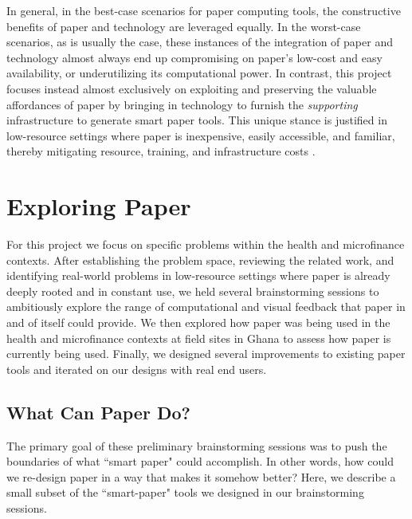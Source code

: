 \documentclass{sig-alternate}
\begin{document}
In general, in the best-case scenarios for paper computing tools, the constructive benefits of paper and technology are leveraged equally. In the worst-case scenarios, as is usually the case, these instances of the integration of paper and technology almost always end up compromising on paper's low-cost and easy availability, or underutilizing its computational power. In contrast, this project focuses instead almost exclusively on exploiting and preserving the valuable affordances of paper by bringing in technology to furnish the \emph{supporting} infrastructure to generate smart paper tools. This unique stance is justified in low-resource settings where paper is inexpensive, easily accessible, and familiar, thereby mitigating resource, training, and infrastructure costs \cite{chen2012}.



\section{Exploring Paper}
\label{sec:exploring-paper}

For this project we focus on specific problems within the health and microfinance contexts. After establishing the problem space, reviewing the related work, and identifying real-world problems in low-resource settings where paper is already deeply rooted and in constant use, we held several brainstorming sessions to ambitiously explore the range of computational and visual feedback that paper in and of itself could provide. We then explored how paper was being used in the health and microfinance contexts at field sites in Ghana to assess how paper is currently being used. Finally, we designed several improvements to existing paper tools and iterated on our designs with real end users.

\subsection{What Can Paper Do?}

The primary goal of these preliminary brainstorming sessions was to push the boundaries of what ``smart paper" could accomplish. In other words, how could we re-design paper in a way that makes it somehow better? Here, we describe a small subset of the ``smart-paper" tools we designed in our brainstorming sessions.
\end{document}
